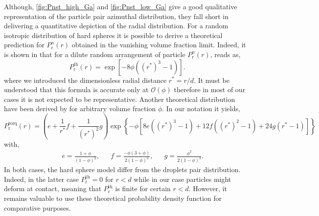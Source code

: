 Although, \ref{fig:Pnst_high_Ga} and \ref{fig:Pnst_low_Ga} give a good qualitative representation of the particle pair azimuthal distribution, they fall short in delivering a quantitative depiction of the radial distribution.
For a random isotropic distribution of hard spheres it is possible to derive a theoretical prediction for $P_\text{r}^n(r)$ obtained in the vanishing volume fraction limit. 
Indeed, it is shown in \citet{zhang2021ensemble} that for a dilute random arrangement of particle $P_\text{r}^n(r)$, reads as, 
\begin{equation}
    P_\text{r}^\text{th}(r) = \exp\left[- 8\phi\left((r^*)^3-1\right)\right].
    \label{eq:Pnst_dilute}
\end{equation}
where we introduced the dimensionless radial distance $r^* = r/d$. 
It must be understood that this formula is accurate only at $\mathcal{O}(\phi)$ therefore in most of our cases it is not expected to be representative.
Another theoretical distribution have been derived by \citet{torquato1990nearest} for arbitrary volume fraction $\phi$. 
In our notation it yields, 
\begin{equation}
    P_\text{r}^\text{torq}(r) = 
        \left(e+\frac{1}{r^*}f +\frac{1}{(r^*)^2}g\right)
    \exp\left\{-\phi\left[8e\left((r^*)^3-1\right)+12 f\left((r^*)^2-1\right)+24g\left(r^*-1\right)\right]\right\}
    \label{eq:torquato}
\end{equation}
with, 
\begin{align*}
    && e= \frac{1+\phi}{(1-\phi)^3},
    && f= \frac{-\phi (3+\phi)}{2(1-\phi)^3},
    && g= \frac{\phi^2}{2(1-\phi)^3}.
\end{align*}
In both cases, the hard sphere model differ from the droplets pair distribution.
Indeed, in the latter case $P_\text{r}^\text{th} = 0$ for $r<d$ while in our case particles might deform at contact, meaning that $P_\text{r}^\text{th}$ is finite for certain $r<d$. 
However, it remains valuable to use these theoretical probability density function for comparative purposes. 

